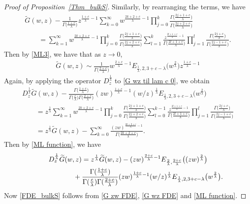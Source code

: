 \begin{proof}[Proof of Proposition~\ref{Thm_bulkS}]
	Similarly, by rearranging the terms, we have
	\begin{gather}
 \widetilde{G}(w,z)-\frac{ 1 }{\Gamma\big( \frac{1+c}{\lambda}\big)} z^{ \frac{1+c}{\lambda}-1 } \sum_{k=0}^{\infty} w^{ \frac{2k+2+c}{\lambda}-1 } \prod_{j=0}^k \frac{ \Gamma\big( \frac{2j+1+c}{\lambda} \big) }{\Gamma\big( \frac{2j+2+c}{\lambda} \big)}
			\nonumber\\
\qquad{} =\sum_{k=1}^{\infty} w^{ \frac{2k+2+c}{\lambda}-1 } \prod_{j=0}^k \frac{ \Gamma\big( \frac{2j+1+c}{\lambda} \big) }{\Gamma\big( \frac{2j+2+c}{\lambda} \big)} \sum_{l=1}^{k} \frac{ z^{ \frac{2l+1+c}{\lambda}-1 } }{\Gamma\big( \frac{2l+1+c}{\lambda} \big)} \prod_{j=1}^l \frac{\Gamma\big(\frac{2j+c}{\lambda}\big) }{ \Gamma\big( \frac{2j-1+c}{\lambda} \big) } .\label{G wz til lam c 0}
		\end{gather}
	Then by \eqref{ML3}, we have that as $z\to 0$,
	\begin{gather*} %
		\widetilde{G}(w,z)\sim \frac{1 }{ \Gamma\big( \frac{2+c}{\lambda}\big) } w^{ \frac{2+c}{\lambda}-1 } E_{\frac{1}{\lambda},2,3+c-\lambda}\big(w^{\frac{2}{\lambda}}\big) z^{ \frac{1+c}{\lambda}-1 }
	\end{gather*}
	Again, by applying the operator $D_z^{ \frac{1}{\lambda} }$ to \eqref{G wz til lam c 0}, we obtain
	\begin{gather*}
D_z^{ \frac{1}{\lambda} } \widetilde{G}(w,z)-\frac{ \Gamma\big(\frac{1+c}{\lambda}\big) }{\Gamma\big( \frac{c}{\lambda}\big) \Gamma\big( \frac{2+c}{\lambda}\big) } (zw)^{ \frac{1+c}{\lambda}-1 }(w/z)^{\frac{1}{\lambda}} E_{\frac{1}{\lambda},2,3+c-\lambda}\big(w^{\frac{2}{\lambda}}\big)\\
\qquad{} = z^{ \frac{1}{\lambda} } \sum_{k=1}^{\infty} w^{ \frac{2k+2+c}{\lambda}-1 } \prod_{j=0}^k \frac{ \Gamma\big( \frac{2j+1+c}{\lambda} \big) }{\Gamma\big( \frac{2j+2+c}{\lambda} \big)} \sum_{l=0}^{k-1} \frac{ z^{ \frac{2l+1+c}{\lambda}-1 } }{\Gamma\big( \frac{2l+1+c}{\lambda} \big)} \prod_{j=1}^l \frac{\Gamma\big(\frac{2j+c}{\lambda}\big) }{ \Gamma\big( \frac{2j-1+c}{\lambda} \big) }
		\\
\qquad{} = z^{ \frac{1}{\lambda} } \widetilde{G}(w,z)- \sum_{k=0}^{\infty} \frac{(zw)^{ \frac{2k+2+c}{\lambda}-1 }}{\Gamma\big( \frac{2k+2+c}{\lambda} \big)}.
	\end{gather*}
	Then by \eqref{ML function}, we have
	\begin{gather}
D_z^{ \frac{1}{\lambda} } \widetilde{G}(w,z)= z^{ \frac{1}{\lambda} } \widetilde{G}(w,z) -(zw)^{\frac{2+c}{\lambda}-1} E_{\frac{2}{\lambda},\frac{2+c}{\lambda}} \big((zw)^{\frac{2}{\lambda}}\big) \nonumber\\
\hphantom{D_z^{ \frac{1}{\lambda} } \widetilde{G}(w,z)=}{}
+\frac{ \Gamma(\frac{1+c}{\lambda}) }{\Gamma( \frac{c}{\lambda}) \Gamma( \frac{2+c}{\lambda}) } (zw)^{ \frac{1+c}{\lambda}-1 }(w/z)^{\frac{1}{\lambda}} E_{\frac{1}{\lambda},2,3+c-\lambda}\big(w^{\frac{2}{\lambda}}\big) . \label{G wz FDE}
		\end{gather}
	Now \eqref{FDE_bulkS} follows from \eqref{G zw FDE}, \eqref{G wz FDE} and \eqref{ML function}.
\end{proof}


